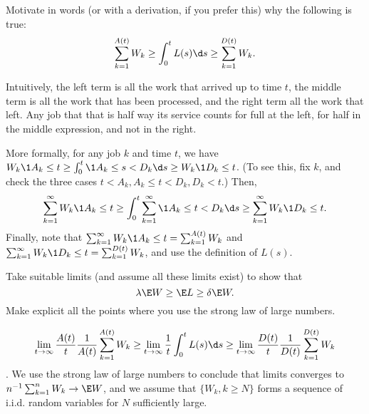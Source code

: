 \begin{exercise}
 Motivate in words (or with a derivation, if you prefer this) why the following is true:
 \begin{equation*}
 \sum_{k=1}^{A(t)} W_k \geq \int_0^t L(s) \d s \geq \sum_{k=1}^{D(t)} W_k.
 \end{equation*}
\begin{solution}
 Intuitively, the left term is all the work that arrived up to time $t$, the middle term is all the work that has been processed, and the right term all the work that left.
 Any job that that is half way its service counts for full at the left, for half in the middle expression, and not in the right.

 More formally, for any job $k$ and time $t$, we have $W_k \1{A_k \leq t} \geq \int_0^t \1{A_k \leq s < D_k } \d s \geq W_k \1{D_k \leq t}$. (To see this, fix $k$, and check the three cases $t < A_k, A_k \leq t < D_k, D_k < t$.) Then,
 \begin{equation*}
 \sum_{k=1}^\infty W_k \1{A_k \leq t} \geq \int_0^t \sum_{k=1}^\infty \1{A_k \leq t < D_k} \d s \geq \sum_{k=1}^\infty W_k \1{D_k \leq t}. 
 \end{equation*}
 Finally, note that $ \sum_{k=1}^\infty W_k \1{A_k \leq t} = \sum_{k=1}^{A(t)} W_k$ and $ \sum_{k=1}^\infty W_k \1{D_k \leq t} = \sum_{k=1}^{D(t)} W_k$, and use the definition of $L(s)$.
\end{solution}
\end{exercise}

\begin{exercise}
Take suitable limits (and assume all these limits exist) to show that 
 \begin{equation*}
\lambda \E W \geq \E L \geq \delta \E W.
 \end{equation*}
 Make explicit all the points where you use the strong law of large numbers.
\begin{solution}
 \begin{equation*}
 \lim_{t\to\infty} \frac{A(t)}{t}\frac 1{A(t)}\sum_{k=1}^{A(t)} W_k \geq \lim_{t\to \infty} \frac 1 t \int_0^t L(s) \d s \geq \lim_{t\to\infty} \frac{D(t)}{t}\frac 1{D(t)} \sum_{k=1}^{D(t)} W_k 
 \end{equation*}.
 We use the strong law of large numbers to conclude that limits converges to $n^{-1} \sum_{k=1}^n W_k \to \E W$, and we assume that $\{W_k, k\geq N\}$ forms a sequence of i.i.d.
 random variables for $N$ sufficiently large.
\end{solution}
\end{exercise}


